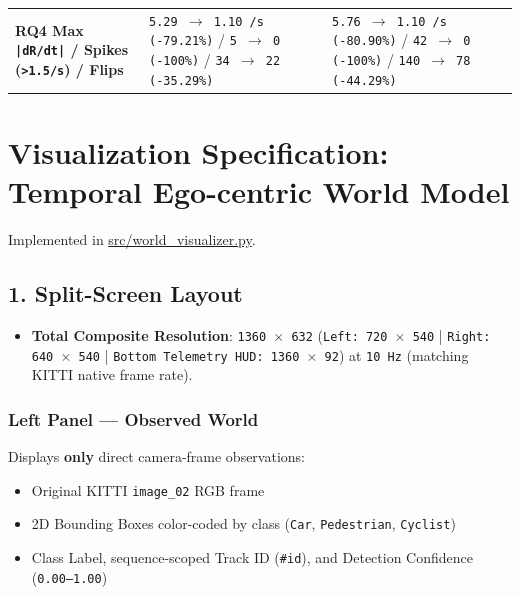 \documentclass[10.5pt,a4paper]{article}
\begin{document}
\begin{footnotesize}
\begin{longtable}{>{\raggedright\arraybackslash}p{} >{\raggedright\arraybackslash}p{} >{\raggedright\arraybackslash}p{}}
\textbf{RQ4 Max \texttt{|dR/\allowbreak{}dt|} / Spikes (\texttt{>1.\allowbreak{}5/\allowbreak{}s}) / Flips} & \texttt{5.\allowbreak{}29 $\rightarrow$ 1.\allowbreak{}10 /\allowbreak{}s (-\allowbreak{}79.\allowbreak{}21\%)} / \texttt{5 $\rightarrow$ 0 (-\allowbreak{}100\%)} / \texttt{34 $\rightarrow$ 22 (-\allowbreak{}35.\allowbreak{}29\%)} & \texttt{5.\allowbreak{}76 $\rightarrow$ 1.\allowbreak{}10 /\allowbreak{}s (-\allowbreak{}80.\allowbreak{}90\%)} / \texttt{42 $\rightarrow$ 0 (-\allowbreak{}100\%)} / \texttt{140 $\rightarrow$ 78 (-\allowbreak{}44.\allowbreak{}29\%)} \\
\end{longtable}
\end{footnotesize}



\newpage
\section{Visualization Specification: Temporal Ego-centric World Model}

Implemented in \href{https://github.com/Heisnotanimposter/Totalcare\_autonomous\_driving\_Yolov5/blob/main/src/world\_visualizer.py}{src/world\_visualizer.py}.


\subsection{1. Split-Screen Layout}

\begin{itemize}[leftmargin=1.5em,itemsep=2pt]
\item \textbf{Total Composite Resolution}: \texttt{1360 $\times$ 632} (\texttt{Left:\allowbreak{} 720 $\times$ 540} | \texttt{Right:\allowbreak{} 640 $\times$ 540} | \texttt{Bottom Telemetry HUD:\allowbreak{} 1360 $\times$ 92}) at \texttt{10 Hz} (matching KITTI native frame rate).
\end{itemize}

\subsubsection{Left Panel --- Observed World}
Displays \textbf{only} direct camera-frame observations:

\begin{itemize}[leftmargin=1.5em,itemsep=2pt]
\item Original KITTI \texttt{image\_\allowbreak{}02} RGB frame
\item 2D Bounding Boxes color-coded by class (\texttt{Car}, \texttt{Pedestrian}, \texttt{Cyclist})
\item Class Label, sequence-scoped Track ID (\texttt{\#id}), and Detection Confidence (\texttt{0.\allowbreak{}00--1.\allowbreak{}00})
\end{itemize}
\end{document}
